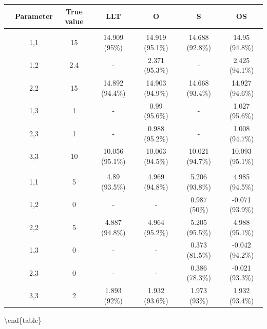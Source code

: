 \documentclass[
]{article}
\begin{document}
\begin{tabular}[t]{ccccccc}
\toprule
 & Parameter & True value & LLT & O & S & OS\\
\midrule
\addlinespace[0.3em]
\multicolumn{7}{l}{\textbf{Observation Error}}\\
\hspace{1em} & 1,1 & 15 & 14.909 (95\%) & 14.919 (95.1\%) & 14.688 (92.8\%) & 14.95 (94.8\%)\\
\cmidrule{2-7}
\hspace{1em} & 1,2 & 2.4 & - & 2.371 (95.3\%) & - & 2.425 (94.1\%)\\
\cmidrule{2-7}
\hspace{1em} & 2,2 & 15 & 14.892 (94.4\%) & 14.903 (94.9\%) & 14.668 (93.4\%) & 14.927 (94.6\%)\\
\cmidrule{2-7}
\hspace{1em} & 1,3 & 1 & - & 0.99 (95.6\%) & - & 1.027 (95.6\%)\\
\cmidrule{2-7}
\hspace{1em} & 2,3 & 1 & - & 0.988 (95.2\%) & - & 1.008 (94.7\%)\\
\cmidrule{2-7}
\hspace{1em} & 3,3 & 10 & 10.056 (95.1\%) & 10.063 (94.5\%) & 10.021 (94.7\%) & 10.093 (95.1\%)\\
\cmidrule{1-7}
\addlinespace[0.3em]
\multicolumn{7}{l}{\textbf{State Process}}\\
\hspace{1em} & 1,1 & 5 & 4.89 (93.5\%) & 4.969 (94.8\%) & 5.206 (93.8\%) & 4.985 (94.5\%)\\
\cmidrule{2-7}
\hspace{1em} & 1,2 & 0 & - & - & 0.987 (50\%) & -0.071 (93.9\%)\\
\cmidrule{2-7}
\hspace{1em} & 2,2 & 5 & 4.887 (94.8\%) & 4.964 (95.2\%) & 5.205 (95.5\%) & 4.988 (95.1\%)\\
\cmidrule{2-7}
\hspace{1em} & 1,3 & 0 & - & - & 0.373 (81.5\%) & -0.042 (94.2\%)\\
\cmidrule{2-7}
\hspace{1em} & 2,3 & 0 & - & - & 0.386 (78.3\%) & -0.021 (93.3\%)\\
\cmidrule{2-7}
\hspace{1em} & 3,3 & 2 & 1.893 (92\%) & 1.932 (93.6\%) & 1.973 (93\%) & 1.932 (93.4\%)\\
\bottomrule
\end{tabular}

\textbackslash end\{table\}
\end{document}
